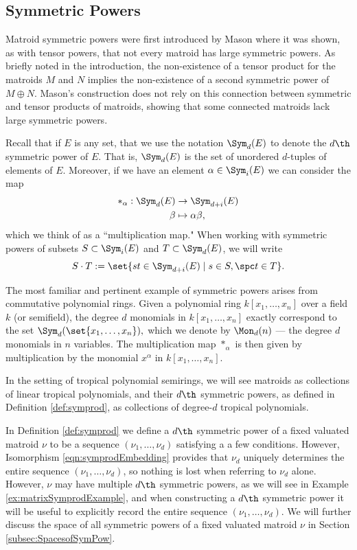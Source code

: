 \subsection{Symmetric Powers}\label{subsec:SymPowers}

Matroid symmetric powers were first introduced by Mason \cite{MGlueing} where it was shown, as with tensor powers, that not every matroid has large symmetric powers. As briefly noted in the introduction, the non-existence of a tensor product for the matroids $M$ and $N$ implies the non-existence of a second symmetric power of $M\oplus N$. Mason's construction does not rely on this connection between symmetric and tensor products of matroids, showing that some connected matroids lack large symmetric powers.

Recall that if $E$ is any set, that we use the notation $\Sym_d(E)$ to denote the $d\th$ symmetric power of $E$. That is, $\Sym_d(E)$ is the set of unordered $d$-tuples of elements of $E$. Moreover, if we have an element $\alpha \in \Sym_i(E)$ we can consider the map
    \begin{align*}
        *_\alpha: \Sym_d(E)&\to \Sym_{d+i}(E)\\
        \beta&\mapsto \alpha\beta,
    \end{align*}
 which we think of as a ``multiplication map." When working with symmetric powers of subsets $S\subset \Sym_{i}(E)$ and $T\subset \Sym_{d}(E)$, we will write 
$$S\cdot T:= \set{ st\in \Sym_{d+i}(E)\mid s\in S, \spc t\in T}.$$

The most familiar and pertinent example of symmetric powers arises from commutative polynomial rings. Given a polynomial ring $k[x_1,\dots,x_n]$ over a field $k$ (or semifield), the degree $d$ monomials in $k[x_1,\dots,x_n]$ exactly correspond to the set $\Sym_d(\set{x_1,\dots,x_n}),$ which we denote by $\Mon_d(n)$ --- the degree $d$ monomials in $n$ variables. The multiplication map $*_\alpha$ is then given by multiplication by the monomial $x^\alpha$ in $k[x_1,\dots,x_n]$.

In the setting of tropical polynomial semirings, we will see matroids as collections of linear tropical polynomials, and their $d\th$ symmetric powers, as defined in Definition \ref{def:symprod}, as collections of degree-$d$ tropical polynomials.

\begin{remark}
In Definition \ref{def:symprod} we define a $d\th$ symmetric power of a fixed valuated matroid $\nu$ to be a sequence $(\nu_1,\dots,\nu_d)$ satisfying a a few conditions. However, Isomorphism \ref{eqn:symprodEmbedding} provides that $\nu_d$ uniquely determines the entire sequence $(\nu_1,\dots,\nu_d)$, so nothing is lost when referring to $\nu_d$ alone. However, $\nu$ may have multiple $d\th$ symmetric powers, as we will see in Example \ref{ex:matrixSymprodExample}, and when constructing a $d\th$ symmetric power it will be useful to explicitly record the entire sequence $(\nu_1,\dots,\nu_d)$. We will further discuss the space of all symmetric powers of a fixed valuated matroid $\nu$ in Section \ref{subsec:SpacesofSymPow}.
\end{remark}

